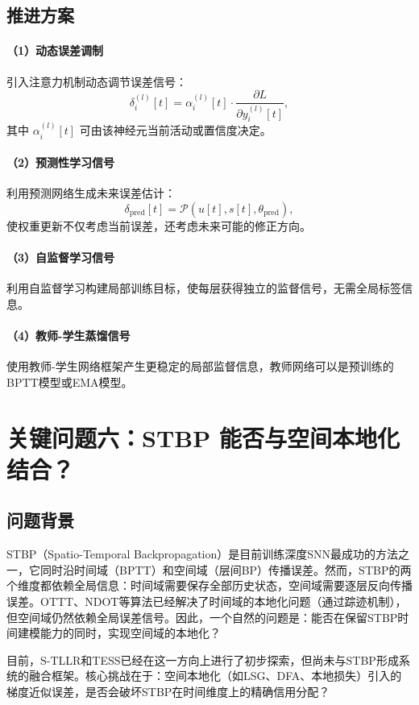 \documentclass[journal,12pt,onecolumn]{IEEEtran}
\begin{document}
\subsection{推进方案}

\paragraph{（1）动态误差调制}
引入注意力机制动态调节误差信号：
\[
\delta_i^{(l)}[t] = \alpha_i^{(l)}[t] \cdot \frac{\partial L}{\partial y_i^{(l)}[t]},
\]
其中 \(\alpha_i^{(l)}[t]\) 可由该神经元当前活动或置信度决定。

\paragraph{（2）预测性学习信号}
利用预测网络生成未来误差估计：
\[
\delta_{\text{pred}}[t] = \mathcal{P}\left(u[t], s[t], \theta_{\text{pred}}\right),
\]
使权重更新不仅考虑当前误差，还考虑未来可能的修正方向。

\paragraph{（3）自监督学习信号}
利用自监督学习构建局部训练目标，使每层获得独立的监督信号，无需全局标签信息。

\paragraph{（4）教师-学生蒸馏信号}
使用教师-学生网络框架产生更稳定的局部监督信息，教师网络可以是预训练的BPTT模型或EMA模型。

\section{关键问题六：STBP 能否与空间本地化结合？}

\subsection{问题背景}

STBP（Spatio-Temporal Backpropagation）是目前训练深度SNN最成功的方法之一，它同时沿时间域（BPTT）和空间域（层间BP）传播误差。然而，STBP的两个维度都依赖全局信息：时间域需要保存全部历史状态，空间域需要逐层反向传播误差。OTTT、NDOT等算法已经解决了时间域的本地化问题（通过踪迹机制），但空间域仍然依赖全局误差信号。因此，一个自然的问题是：能否在保留STBP时间建模能力的同时，实现空间域的本地化？

目前，S-TLLR和TESS已经在这一方向上进行了初步探索，但尚未与STBP形成系统的融合框架。核心挑战在于：空间本地化（如LSG、DFA、本地损失）引入的梯度近似误差，是否会破坏STBP在时间维度上的精确信用分配？
\end{document}
